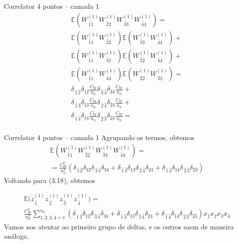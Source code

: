 \documentclass{beamer}
\newcommand{\EE}{\mathbb{E}}
\def\mi#1{{\,\widehat{#1}}}
\def\mj#1{\underline{#1}}
\begin{document}
\begin{frame}{Correlator 4 pontos -- camada 1}
	\begin{multline*}
		\EE\left(W^{(1)}_{\mi1\mj1}W^{(1)}_{\mi2\mj2}W^{(1)}_{\mi3\mj3}W^{(1)}_{\mi4\mj4}\right) = \\
		\EE\left(W^{(1)}_{\mi1\mj1}W^{(1)}_{\mi2\mj2}\right)\EE\left(W^{(1)}_{\mi3\mj3}W^{(1)}_{\mi4\mj4}\right) + \\
		\EE\left(W^{(1)}_{\mi1\mj1}W^{(1)}_{\mi3\mj3}\right)\EE\left(W^{(1)}_{\mi2\mj2}W^{(1)}_{\mi4\mj4}\right) + 	\\ 
		\EE\left(W^{(1)}_{\mi1\mj1}W^{(1)}_{\mi4\mj4}\right)\EE\left(W^{(1)}_{\mi2\mj2}W^{(1)}_{\mi2\mj3}\right) = \\
		\delta_{\mi1\mi2}\delta_{\mj1\mj2}\frac{C_W}{n_0}\delta_{\mi3\mi4}\delta_{\mj3\mj4}\frac{C_W}{n_0} + \\
		\delta_{\mi1\mi3}\delta_{\mj1\mj3}\frac{C_W}{n_0}\delta_{\mi2\mi4}\delta_{\mj2\mj4}\frac{C_W}{n_0} + \\
		 \delta_{\mi1\mi4}\delta_{\mj1\mj4}\frac{C_W}{n_0}\delta_{\mi2\mi3}\delta_{\mj2\mj3}\frac{C_W}{n_0} =\\
	\end{multline*}
\end{frame}
\begin{frame}{Correlator 4 pontos -- camada 1}
	Agrupando os termos, obtemos
	\begin{multline*}
		\EE\left(W^{(1)}_{\mi1\mj1}W^{(1)}_{\mi2\mj2}W^{(1)}_{\mi3\mj3}W^{(1)}_{\mi4\mj4}\right) =\\= \frac{C_W^2}{n_0^2}\left(\delta_{\mi1\mi2}\delta_{\mj1\mj2}\delta_{\mi3\mi4}\delta_{\mj3\mj4} + \delta_{\mi1\mi3}\delta_{\mj1\mj3} \delta_{\mi2\mi4}\delta_{\mj2\mj4} + \delta_{\mi1\mi4}\delta_{\mj1\mj4} \delta_{\mi2\mi3}\delta_{\mj2\mj3}\right)
	\end{multline*}
	Voltando para (3.18), obtemos
\end{frame}
\begin{frame}
	\begin{multline*}
		\EE\big(z^{(1)}_{\mi1} z^{(1)}_{\mi2} z^{(1)}_{\mi3} z^{(1)}_{\mi4}\big) = \\
		\frac{C_W^2}{n_0^2}\sum_{\mj1,\mj2,\mj3,\mj4=1}^{n_0} \left(\delta_{\mi1\mi2}\delta_{\mj1\mj2}\delta_{\mi3\mi4}\delta_{\mj3\mj4} + \delta_{\mi1\mi3}\delta_{\mj1\mj3} \delta_{\mi2\mi4}\delta_{\mj2\mj4} + \delta_{\mi1\mi4}\delta_{\mj1\mj4} \delta_{\mi2\mi3}\delta_{\mj2\mj3}\right) x_{\mj1}x_{\mj2}x_{\mj3}x_{\mj4}
	\end{multline*}
	Vamos nos atentar ao primeiro grupo de deltas, e os outros saem de maneira análoga.
\end{frame}
\end{document}
